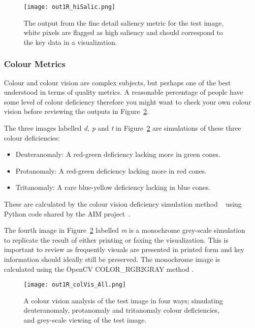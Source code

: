 \begin{figure}[htb]
  \centering
  \texttt{[image: out1R\_hiSalic.png]}
  \caption{\label{fig:testSaliency}
           The output from the fine detail saliency metric for the test image, white pixels are flagged as high saliency and should correspond to the key data in a visualization.}
\end{figure}

\subsubsection{Colour Metrics}
Colour and colour vision are complex subjects, but perhaps one of the best understood in terms of quality metrics. A reasonable percentage of people have some level of colour deficiency therefore you might want to check your own colour vision before reviewing the outputs in Figure~\ref{fig:testColour}.

The three images labelled \textit{ d, p} and \textit{t} in Figure~\ref{fig:testColour} are simulations of these three colour deficiencies:
\begin{itemize} 
\item Deuteranomaly: A red-green deficiency lacking more in green cones.
\item Protanomaly: A red-green deficiency lacking more in red cones.
\item Tritanomaly: A rare blue-yellow deficiency lacking in blue cones.
\end{itemize} 
These are calculated by the colour vision deficiency simulation method ~\cite{machado2009} using Python code shared by the {AIM} project~\cite{Oulasvirta:2018}. 

The fourth image in Figure~\ref{fig:testColour} labelled \textit{m} is a monochrome grey-scale simulation to replicate the result of either printing or faxing the visualization. This is important to review as frequently visuals are presented in printed form and key information should ideally still be preserved. The monochrome image is calculated using the {OpenCV} {COLOR\_RGB2GRAY} method \cite{opencv2008}.

\begin{figure}[htb]
  \centering
  \texttt{[image: out1R\_colVis\_All.png]}
  \caption{\label{fig:testColour}
           A colour vision analysis of the test image in four ways; simulating deuteranomaly, protanomaly and tritanomaly colour deficiencies, and grey-scale viewing of the test image. }
\end{figure}

